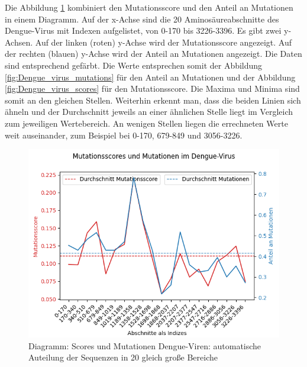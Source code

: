 \documentclass[german,version-2022-01]{uzl-thesis}
\begin{document}
Die Abbildung \ref{fig:Dengue_virus_scores_and_mutations_bereiche} kombiniert den Mutationsscore und den Anteil an Mutationen in einem Diagramm. Auf der x-Achse sind die 20 Aminos\"aureabschnitte des Dengue-Virus mit Indexen aufgelistet, von 0-170 bis 3226-3396. Es gibt zwei y-Achsen. Auf der linken (roten) y-Achse wird der Mutationsscore angezeigt. Auf der rechten (blauen) y-Achse wird der Anteil an Mutationen angezeigt. Die Daten sind entsprechend gef\"arbt. Die Werte entsprechen somit der Abbildung \ref{fig:Dengue_virus_mutations} f\"ur den Anteil an Mutationen und der Abbildung \ref{fig:Dengue_virus_scores} f\"ur den Mutationsscore. Die Maxima und Minima sind somit an den gleichen Stellen. Weiterhin erkennt man, dass die beiden Linien sich \"ahneln und der Durchschnitt jeweils an einer \"ahnlichen Stelle liegt im Vergleich zum jeweiligen Wertebereich. An wenigen Stellen liegen die errechneten Werte weit auseinander, zum Beispiel bei 0-170, 679-849 und 3056-3226.
\begin{figure}[tbp]
  \centering
  \includegraphics[scale=0.75]{Images/Diagramm_Scores_und_Mutationen_Dengue_viren_Bereiche.png}
  \caption{Diagramm: Scores und Mutationen Dengue-Viren: automatische Auteilung der Sequenzen in 20 gleich gro\ss{}e Bereiche}
  \label{fig:Dengue_virus_scores_and_mutations_bereiche}
\end{figure}
\end{document}
